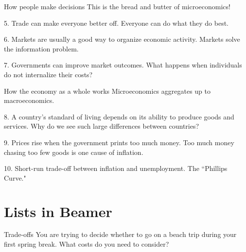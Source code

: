 \documentclass{beamer}
\begin{document}
\begin{frame}{How people make decisions}
    This is the bread and butter of microeconomics!
    
    \medskip

    \begin{block}{5. Trade can make everyone better off.}
        Everyone can do what they do best.
    \end{block}

    \begin{block}{6. Markets are usually a good way to organize economic activity.}
        Markets solve the information problem.
    \end{block}

    \begin{block}{7. Governments can improve market outcomes.}
        What happens when individuals do not internalize their costs?
    \end{block}
\end{frame} 

\begin{frame}{How the economy as a whole works}
    Microeconomics aggregates up to macroeconomics.

    \medskip

    \begin{block}{8. A country's standard of living depends on its ability to produce goods and services.}
        Why do we see such large differences between countries?
    \end{block}

    \begin{block}{9. Prices rise when the government prints too much money.}
        Too much money chasing too few goods is one cause of inflation.
    \end{block}

    \begin{block}{10. Short-run trade-off between inflation and unemployment.}
        The ``Phillips Curve."
    \end{block}
    \section{Lists in Beamer}
\end{frame} 

\begin{frame}{Trade-offs}
    You are trying to decide whether to go on a beach trip during your first spring break. What costs do you need to consider? 
\end{frame}
\end{document}
